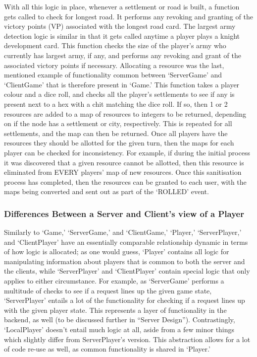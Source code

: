 \documentclass[a4paper,doc,draftfirst]{apa6}
\begin{document}
With all this logic in place, whenever a settlement or road is built, a function gets called to check for longest road. It performs any revoking and granting of the victory points (VP) associated with the longest road card. The largest army detection logic is similar in that it gets called anytime a player plays a knight development card. This function checks the size of the player’s army who currently has largest army, if any, and performs any revoking and grant of the associated victory points if necessary. Allocating a resource was the last, mentioned example of functionality common between ‘ServerGame’ and ‘ClientGame’ that is therefore present in ‘Game.’ This function takes a player colour and a dice roll, and checks all the player’s settlements to see if any is present next to a hex with a chit matching the dice roll. If so, then 1 or 2 resources are added to a map of resources to integers to be returned, depending on if the node has a settlement or city, respectively. This is repeated for all settlements, and the map can then be returned. Once all players have the resources they should be allotted for the given turn, then the maps for each player can be checked for inconsistency. For example, if during the initial process it was discovered that a given resource cannot be allotted, then this resource is eliminated from EVERY players’ map of new resources. Once this sanitisation process has completed, then the resources can be granted to each user, with the maps being converted and sent out as part of the ‘ROLLED’ event.

\subsubsection{Differences Between a Server and Client's view of a Player}
Similarly to ‘Game,’ ‘ServerGame,’ and ‘ClientGame,’ ‘Player,’ ‘ServerPlayer,’ and ‘ClientPlayer’ have an essentially comparable relationship dynamic in terms of how logic is allocated; as one would guess, ‘Player’ contains all logic for manipulating information about players that is common to both the server and the clients, while ‘ServerPlayer’ and ‘ClientPlayer’ contain special logic that only applies to either circumstance. For example, as ‘ServerGame’ performs a multitude of checks to see if a request lines up the given game state, ‘ServerPlayer’ entails a lot of the functionality for checking if a request lines up with the given player state. This represents a layer of functionality in the backend, as well (to be discussed further in “Server Design”). Contrastingly, ‘LocalPlayer’ doesn’t entail much logic at all, aside from a few minor things which slightly differ from ServerPlayer’s version. This abstraction allows for a lot of code re-use as well, as common functionality is shared in ‘Player.’
\end{document}
